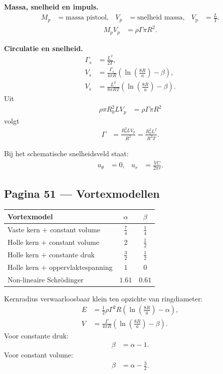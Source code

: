 \documentclass[11pt]{article}
\begin{document}
\textbf{Massa, snelheid en impuls.}
\begin{align*}
M_p&=\text{massa pistool},&
V_p&=\text{snelheid massa},&
V_p&=\frac{L}{T}.
\end{align*}
\begin{align*}
M_pV_p&=\rho\Gamma\pi R^2.
\end{align*}

\textbf{Circulatie en snelheid.}
\begin{align*}
\Gamma_s &= \frac{L^2}{2T},\\
V_s
&=
\frac{\Gamma_s}{4\pi R}
\left(\ln\left(\frac{8R}{a}\right)-\beta\right),\\
V_s
&=
\frac{L^2}{8\pi RT}
\left(\ln\left(\frac{8R}{a}\right)-\beta\right).
\end{align*}
Uit
\begin{align*}
\rho\pi R_0^2LV_p&=\rho\Gamma\pi R^2
\end{align*}
volgt
\begin{align*}
\Gamma
&=
\frac{R_0^2LV_p}{R^2}
=
\frac{R_0^2L^2}{R^2T}.
\end{align*}

Bij het schematische snelheidsveld staat:
\begin{align*}
u_\theta&=0,&
u_r&=\frac{\dot{V}C}{2\pi r}.
\end{align*}

\subsection*{Pagina 51 --- Vortexmodellen}

\begin{center}
\begin{tabular}{>{\raggedright\arraybackslash}p{7cm}cc}
\toprule
\textbf{Vortexmodel} & $\alpha$ & $\beta$\\
\midrule
Vaste kern $+$ constant volume & $\frac{7}{4}$ & $\frac{1}{4}$\\
Holle kern $+$ constant volume & $2$ & $\frac{1}{2}$\\
Holle kern $+$ constante druk & $\frac{3}{2}$ & $\frac{1}{2}$\\
Holle kern $+$ oppervlaktespanning & $1$ & $0$\\
Non-lineaire Schrödinger & $1.61$ & $0.61$\\
\bottomrule
\end{tabular}
\end{center}

Kernradius verwaarloosbaar klein ten opzichte van ringdiameter:
\begin{align*}
E
&=
\frac{1}{2}\rho\Gamma^2R
\left(\ln\left(\frac{8R}{a}\right)-\alpha\right),\\
V
&=
\frac{\Gamma}{4\pi R}
\left(\ln\left(\frac{8R}{a}\right)-\beta\right).
\end{align*}
Voor constante druk:
\begin{align*}
\beta &= \alpha-1.
\end{align*}
Voor constant volume:
\begin{align*}
\beta &= \alpha-\frac{3}{2}.
\end{align*}
\end{document}
